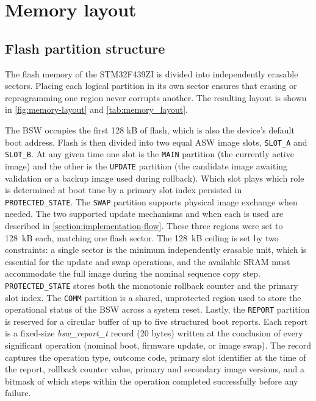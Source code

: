\section{Memory layout}
\label{section:implementation-memory}

\subsection{Flash partition structure}

The flash memory of the STM32F439ZI is divided into independently erasable sectors.
Placing each logical partition in its own sector ensures that erasing or reprogramming one region never corrupts another.
The resulting layout is shown in \autoref{fig:memory-layout} and \autoref{tab:memory_layout}.

The BSW occupies the first 128 kB of flash, which is also the device's default boot address. Flash is then divided into two equal ASW image slots, \texttt{SLOT\_A} and \texttt{SLOT\_B}. At any given time one slot is the \texttt{MAIN} partition (the currently active image) and the other is the \texttt{UPDATE} partition (the candidate image awaiting validation or a backup image used during rollback). Which slot plays which role is determined at boot time by a primary slot index persisted in \texttt{PROTECTED\_STATE}. The \texttt{SWAP} partition supports physical image exchange when needed. The two supported update mechanisms and when each is used are described in \autoref{section:implementation-flow}. These three regions were set to 128~kB each, matching one flash sector. The 128~kB ceiling is set by two constraints: a single sector is the minimum independently erasable unit, which is essential for the update and swap operations, and the available SRAM must accommodate the full image during the nominal sequence copy step. \texttt{PROTECTED\_STATE} stores both the monotonic rollback counter and the primary slot index. The \texttt{COMM} partition is a shared, unprotected region used to store the operational status of the BSW across a system reset. Lastly, the \texttt{REPORT} partition is reserved for a circular buffer of up to five structured boot reports. Each report is a fixed-size \emph{bsw\_report\_t} record (20 bytes) written at the conclusion of every significant operation (nominal boot, firmware update, or image swap). The record captures the operation type, outcome code, primary slot identifier at the time of the report, rollback counter value, primary and secondary image versions, and a bitmask of which steps within the operation completed successfully before any failure.

